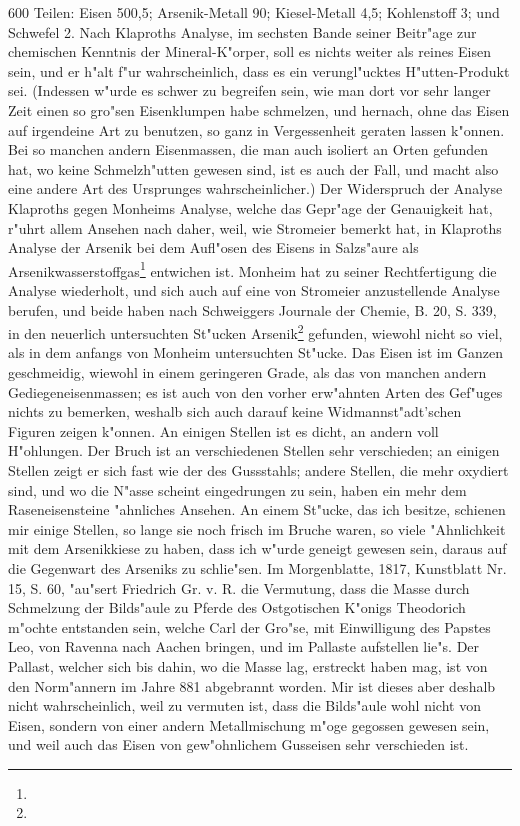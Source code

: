 \documentclass[a4paper, 11pt, oneside, polutonikogreek, german]{article}
\begin{document}
600 Teilen: Eisen 500,5; Arsenik-Metall 90; Kiesel-Metall 4,5; Kohlenstoff 3; und Schwefel 2. Nach Klaproths Analyse, im sechsten Bande seiner Beitr"age zur chemischen Kenntnis der Mineral-K"orper, soll es nichts weiter als reines Eisen sein, und er h"alt f"ur wahrscheinlich, dass es ein verungl"ucktes H"utten-Produkt sei. (Indessen w"urde es schwer zu begreifen sein, wie man dort vor sehr langer Zeit einen so gro"sen Eisenklumpen habe schmelzen, und hernach, ohne das Eisen auf irgendeine Art zu benutzen, so ganz in Vergessenheit geraten lassen k"onnen. Bei so manchen andern Eisenmassen, die man auch isoliert an Orten gefunden hat, wo keine Schmelzh"utten gewesen sind, ist es auch der Fall, und macht also eine andere Art des Ursprunges wahrscheinlicher.) Der Widerspruch der Analyse Klaproths gegen Monheims Analyse, welche das Gepr"age der Genauigkeit hat, r"uhrt allem Ansehen nach daher, weil, wie Stromeier bemerkt hat, in Klaproths Analyse der Arsenik bei dem Aufl"osen des Eisens in Salzs"aure als Arsenikwasserstoffgas\footnote{} entwichen ist. Monheim hat zu seiner Rechtfertigung die Analyse wiederholt, und sich auch auf eine von Stromeier anzustellende Analyse berufen, und beide haben nach Schweiggers Journale der Chemie, B. 20, S. 339, in den neuerlich untersuchten St"ucken Arsenik\footnote{} gefunden, wiewohl nicht so viel, als in dem anfangs von Monheim untersuchten St"ucke. Das Eisen ist im Ganzen geschmeidig, wiewohl in einem geringeren Grade, als das von manchen andern Gediegeneisenmassen; es ist auch von den vorher erw"ahnten Arten des Gef"uges nichts zu bemerken, weshalb sich auch darauf keine Widmannst"adt'schen Figuren zeigen k"onnen. An einigen Stellen ist es dicht, an andern voll H"ohlungen. Der Bruch ist an verschiedenen Stellen sehr verschieden; an einigen Stellen zeigt er sich fast wie der des Gussstahls; andere Stellen, die mehr oxydiert sind, und wo die N"asse scheint eingedrungen zu sein, haben ein mehr dem Raseneisensteine "ahnliches Ansehen. An einem St"ucke, das ich besitze, schienen mir einige Stellen, so lange sie noch frisch im Bruche waren, so viele "Ahnlichkeit mit dem Arsenikkiese zu haben, dass ich w"urde geneigt gewesen sein, daraus auf die Gegenwart des Arseniks zu schlie"sen. Im Morgenblatte, 1817, Kunstblatt Nr. 15, S. 60, "au"sert Friedrich Gr. v. R. die Vermutung, dass die Masse durch Schmelzung der Bilds"aule zu Pferde des Ostgotischen K"onigs Theodorich m"ochte entstanden sein, welche Carl der Gro"se, mit Einwilligung des Papstes Leo, von Ravenna nach Aachen bringen, und im Pallaste aufstellen lie"s. Der Pallast, welcher sich bis dahin, wo die Masse lag, erstreckt haben mag, ist von den Norm"annern im Jahre 881 abgebrannt worden. Mir ist dieses aber deshalb nicht wahrscheinlich, weil zu vermuten ist, dass die Bilds"aule wohl nicht von Eisen, sondern von einer andern Metallmischung m"oge gegossen gewesen sein, und weil auch das Eisen von gew"ohnlichem Gusseisen sehr verschieden ist.
\end{document}
